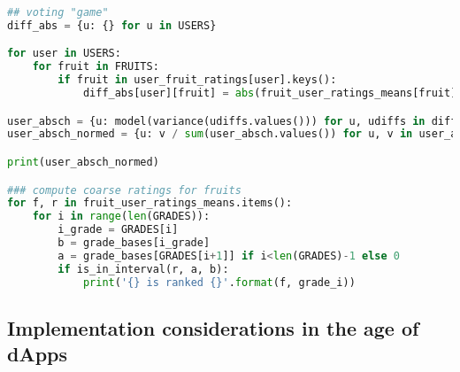 \begin{lstlisting}[language=Python]
## voting "game"                 
diff_abs = {u: {} for u in USERS}

for user in USERS:
    for fruit in FRUITS:
        if fruit in user_fruit_ratings[user].keys():
            diff_abs[user][fruit] = abs(fruit_user_ratings_means[fruit]-user_fruit_ratings[user][fruit])

user_absch = {u: model(variance(udiffs.values())) for u, udiffs in diff_abs.items()}
user_absch_normed = {u: v / sum(user_absch.values()) for u, v in user_absch.items()}

print(user_absch_normed)

### compute coarse ratings for fruits
for f, r in fruit_user_ratings_means.items():
    for i in range(len(GRADES)):
        i_grade = GRADES[i]
        b = grade_bases[i_grade]
        a = grade_bases[GRADES[i+1]] if i<len(GRADES)-1 else 0
        if is_in_interval(r, a, b):
            print('{} is ranked {}'.format(f, grade_i))

\end{lstlisting}

\subsection{Implementation considerations in the age of dApps}

{}%
